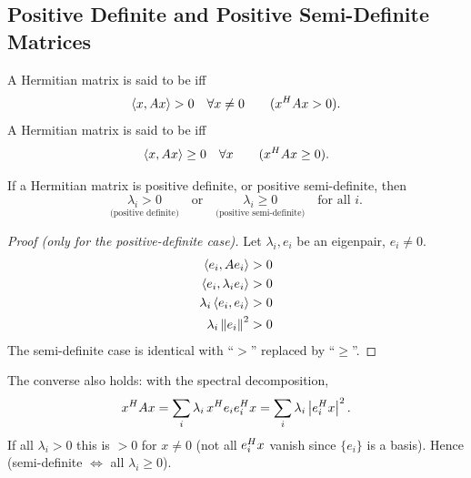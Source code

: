 \subsection{Positive Definite and Positive Semi-Definite Matrices}\label{ss:posdef}
\begin{definition}
A Hermitian matrix is said to be  iff
\[
\left\langle x, Ax \right\rangle > 0 \quad \forall x\neq 0 \qquad (x^{H} A x > 0).
\]
A Hermitian matrix is said to be  iff
\[
\left\langle x, Ax \right\rangle \geq 0 \quad \forall x \qquad (x^{H} A x \geq 0).
\]
\end{definition}

\begin{theorem}
If a Hermitian matrix is positive definite, or positive semi-definite, then
\[
\underset{\text{(positive definite)}}{\lambda_i > 0} \quad\text{or}\quad \underset{\text{(positive semi-definite)}}{\lambda_i \geq 0} \quad\text{for all } i.
\]
\end{theorem}
\begin{proof}[Proof (only for the positive-definite case)]
Let $\lambda_i, e_i$ be an eigenpair, $e_i\neq 0$.
\begin{align*}
\left\langle e_i, Ae_i \right\rangle &> 0\\
\left\langle e_i, \lambda_i e_i \right\rangle &> 0\\
\lambda_i\left\langle e_i, e_i \right\rangle &> 0\\
\lambda_i\left\lVert e_i \right\rVert^2 &> 0
\end{align*}
The semi-definite case is identical with ``$>$'' replaced by ``$\geq$''.
\end{proof}
\begin{insight}[Converse]
The converse also holds: with the spectral decomposition,
\[
x^{H} Ax = \sum_i \lambda_i\, x^{H} e_ie_i^{H} x = \sum_i\lambda_i\left\lvert e_i^{H} x \right\rvert^2 .
\]
If all $\lambda_i>0$ this is $>0$ for $x\neq0$ (not all $e_i^{H} x$ vanish since $\{e_i\}$ is a basis). Hence  (semi-definite $\iff$ all $\lambda_i\geq0$).
\end{insight}

